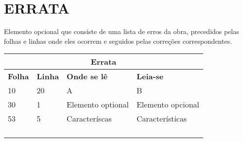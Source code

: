 \chapter*{ERRATA}
Elemento opcional que consiste de uma lista de erros da obra, precedidos pelas folhas e linhas onde eles ocorrem e seguidos pelas correções correspondentes.
\\

\begin{table}[ht]
    \centering
    \footnotesize
   \begin{tabular}{|p{1.4cm}|p{1cm}|p{3cm}|p{3cm}|} \hline
    \multicolumn{4}{|c|}{Errata} \\ \hline
       \textbf{Folha}  & \textbf{Linha} & \textbf{Onde se lê} & \textbf{Leia-se} \\ \hline 
        10 & 20 & A & B \\ \hline
        30 &  1  & Elemento optional  & Elemento opcional \\ \hline
        53 &  5  &  Caracteríscas & Características \\ \hline
           &     &                &                 \\ \hline 
           &     &                &                 \\ \hline 
           &     &                &                 \\ \hline 
           &     &                &                 \\ \hline 
    \end{tabular}
    \label{tab:my_label}
\end{table}

